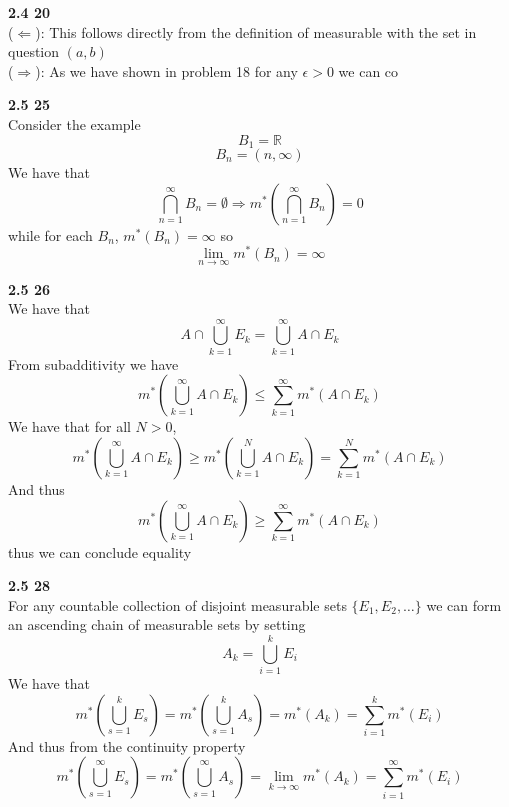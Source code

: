 \documentclass[12pt]{article}
\newenvironment{ques}[1]{\textbf{#1}\vspace{1 mm}\\ }{\bigskip}
\theoremstyle{definition}
\renewcommand{\l}{\left }
\renewcommand{\r}{\right }
\newcommand{\R}{\mathbb R}
\renewcommand{\-}{\backslash}
\begin{document}
\begin{ques}{2.4 20}
	($\Leftarrow$): This follows directly from the definition of measurable
	with the set in question $(a,b)$\\
	($\Rightarrow$): As we have shown in problem 18 for any $\epsilon > 0$ we can co
\end{ques}

\begin{ques}{2.5 25}
	Consider the example 
	$$B_1 = \R$$
	$$B_n = (n, \infty)$$
	We have that
	$$\bigcap_{n=1}^\infty B_n = \emptyset \Rightarrow
	m^*\l(\bigcap_{n=1}^\infty B_n\r) = 0$$
	while for each $B_n$, $m^*(B_n) = \infty$ so
	$$\lim_{n \to \infty} m^*(B_n) = \infty$$
\end{ques}

\begin{ques}{2.5 26}
	We have that 
	$$A \cap  \bigcup_{k=1}^\infty E_k = \bigcup_{k=1}^\infty A \cap E_k$$
	From subadditivity we have
	$$m^*\l(\bigcup_{k=1}^\infty A \cap E_k\r) \leq \sum_{k=1}^\infty m^*(A
	\cap E_k)$$
	We have that for all $N > 0$,
	$$m^*\l(\bigcup_{k=1}^\infty A \cap E_k\r) \geq m^*\l(\bigcup_{k=1}^N A
	\cap E_k \r) = \sum_{k=1}^N m^*(A \cap E_k)$$
	And thus
	$$m^*\l(\bigcup_{k=1}^\infty A \cap E_k\r) \geq \sum_{k=1}^\infty m^*(A
	\cap E_k)$$
	thus we can conclude equality
\end{ques}

\begin{ques}{2.5 28}
	For any countable collection of disjoint measurable sets $\{E_1, E_2, \dots\}$ 
	we can form an ascending chain of measurable sets by setting 
	$$A_k = \bigcup_{i=1}^k E_i$$
	We have that
	$$m^*\l(\bigcup_{s =1}^k E_s\r) = m^*\l(\bigcup_{s =1}^k A_s\r) = m^*(A_k)
	= \sum_{i=1}^k m^*(E_i)$$
	And thus from the continuity property
	$$m^*\l(\bigcup_{s =1}^\infty E_s\r) = m^*\l(\bigcup_{s =1}^\infty A_s\r) =
	\lim_{k \to \infty} m^*(A_k) = \sum_{i=1}^\infty m^*(E_i)$$
\end{ques}
\end{document}
